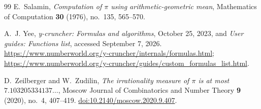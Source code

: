 \documentclass[11pt]{article}
\numberwithin{equation}{section}
\theoremstyle{definition}
\begin{document}
\begin{thebibliography}{99}
E.~Salamin,
\emph{Computation of $\pi$ using arithmetic-geometric mean},
Mathematics of Computation \textbf{30} (1976), no.~135, 565--570.

A.~J. Yee,
\emph{y-cruncher: Formulas and algorithms},
October 25, 2023, and \emph{User guides: Functions list},
accessed September 7, 2026.
\url{https://www.numberworld.org/y-cruncher/internals/formulas.html};
\url{https://www.numberworld.org/y-cruncher/guides/custom_formulas_list.html}.

D.~Zeilberger and W.~Zudilin,
\emph{The irrationality measure of $\pi$ is at most
$7.103205334137\ldots$},
Moscow Journal of Combinatorics and Number Theory \textbf{9}
(2020), no.~4, 407--419.
\href{https://doi.org/10.2140/moscow.2020.9.407}
{doi:10.2140/moscow.2020.9.407}.

\end{thebibliography}
\end{document}
